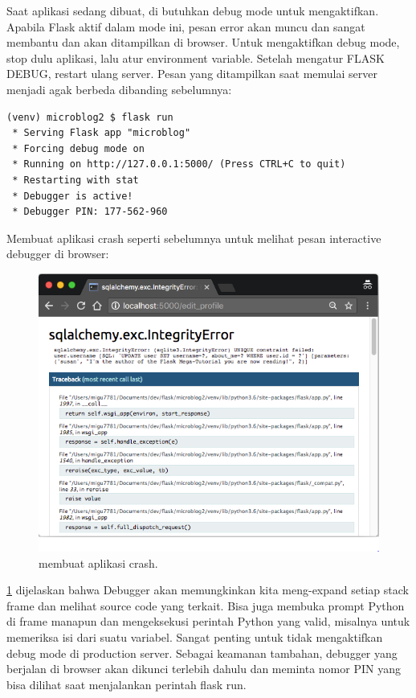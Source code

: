Saat aplikasi sedang dibuat, di butuhkan debug mode untuk mengaktifkan. Apabila Flask aktif dalam mode ini,  pesan error akan muncu dan sangat membantu dan akan ditampilkan di browser. Untuk mengaktifkan debug mode, stop dulu aplikasi, lalu atur environment variable. 
Setelah mengatur FLASK DEBUG, restart ulang server. Pesan yang ditampilkan saat memulai server menjadi agak berbeda dibanding sebelumnya:
\begin{verbatim}
(venv) microblog2 $ flask run
 * Serving Flask app "microblog"
 * Forcing debug mode on
 * Running on http://127.0.0.1:5000/ (Press CTRL+C to quit)
 * Restarting with stat
 * Debugger is active!
 * Debugger PIN: 177-562-960
 \end{verbatim}
 
 Membuat aplikasi crash seperti sebelumnya untuk melihat pesan interactive debugger di browser:
 
 \begin{figure}[ht]
\centerline{\includegraphics[width=1\textwidth]{figures/5eror.PNG}}
\caption{membuat aplikasi crash.}
\label{eror}
\end{figure}
\ref{eror} dijelaskan bahwa Debugger akan memungkinkan kita meng-expand setiap stack frame dan melihat source code yang terkait. Bisa juga membuka prompt Python di frame manapun dan mengeksekusi perintah Python yang valid, misalnya untuk memeriksa isi dari suatu variabel. Sangat penting untuk tidak mengaktifkan debug mode di production server. Sebagai keamanan tambahan, debugger yang berjalan di browser akan dikunci terlebih dahulu dan meminta nomor PIN yang bisa dilihat saat menjalankan perintah flask run. 


